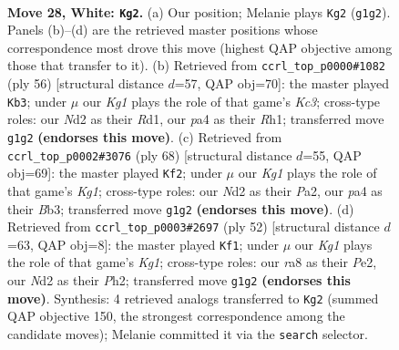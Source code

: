 \documentclass[11pt]{article}
\begin{document}
\clearpage

\begin{figure}[p]\centering
\begin{subfigure}{0.46\textwidth}\centering
\resizebox{\linewidth}{!}{%
\newchessgame
\chessboard[
  setfen={r5k1/8/8/3p2p1/p7/P4n1r/3N3P/R2R2K1 w - - 0 28},
  showmover=false,
  pgfstyle=straightmove, color=movearrow, markmove={g1-g2}
]}
\caption{}
\end{subfigure}\hfill
\begin{subfigure}{0.46\textwidth}\centering
\resizebox{\linewidth}{!}{%
\newchessgame
\chessboard[
  setfen={r5k1/6pp/4p2P/1p1n4/1P6/2K5/p5P1/3R3R w - - 1 29},
  showmover=false,
  pgfstyle=straightmove, color=movearrow, markmove={c3-b3}
]}
\caption{}
\end{subfigure}
\\[4pt]
\begin{subfigure}{0.46\textwidth}\centering
\resizebox{\linewidth}{!}{%
\newchessgame
\chessboard[
  setfen={3r3k/R5Rp/2p5/5p2/8/1B5r/PP2n3/6K1 w - - 2 35},
  showmover=false,
  pgfstyle=straightmove, color=movearrow, markmove={g1-f2}
]}
\caption{}
\end{subfigure}\hfill
\begin{subfigure}{0.46\textwidth}\centering
\resizebox{\linewidth}{!}{%
\newchessgame
\chessboard[
  setfen={6k1/3R1p2/7p/4r3/1r3n2/2N5/1P1RP2P/6K1 w - - 2 27},
  showmover=false,
  pgfstyle=straightmove, color=movearrow, markmove={g1-f1}
]}
\caption{}
\end{subfigure}
\caption{\textbf{Move 28, White: \texttt{Kg2}.} (a) Our position; Melanie plays \texttt{Kg2} (\texttt{g1g2}). Panels (b)--(d) are the retrieved master positions whose correspondence most drove this move (highest QAP objective among those that transfer to it). (b) Retrieved from \texttt{ccrl\_top\_p0000\#1082} (ply 56) [structural distance $d$=57, QAP obj=70]: the master played \texttt{Kb3}; under $\mu$ our \emph{Kg1} plays the role of that game's \emph{Kc3}; cross-type roles: our \emph{N}d2 as their \emph{R}d1, our \emph{p}a4 as their \emph{R}h1; transferred move \texttt{g1g2} \textbf{(endorses this move)}. (c) Retrieved from \texttt{ccrl\_top\_p0002\#3076} (ply 68) [structural distance $d$=55, QAP obj=69]: the master played \texttt{Kf2}; under $\mu$ our \emph{Kg1} plays the role of that game's \emph{Kg1}; cross-type roles: our \emph{N}d2 as their \emph{P}a2, our \emph{p}a4 as their \emph{B}b3; transferred move \texttt{g1g2} \textbf{(endorses this move)}. (d) Retrieved from \texttt{ccrl\_top\_p0003\#2697} (ply 52) [structural distance $d$=63, QAP obj=8]: the master played \texttt{Kf1}; under $\mu$ our \emph{Kg1} plays the role of that game's \emph{Kg1}; cross-type roles: our \emph{r}a8 as their \emph{P}e2, our \emph{N}d2 as their \emph{P}h2; transferred move \texttt{g1g2} \textbf{(endorses this move)}. Synthesis: 4 retrieved analogs transferred to \texttt{Kg2} (summed QAP objective 150, the strongest correspondence among the candidate moves); Melanie committed it via the \texttt{search} selector.}
\label{fig:thought-m54}
\end{figure}
\end{document}
